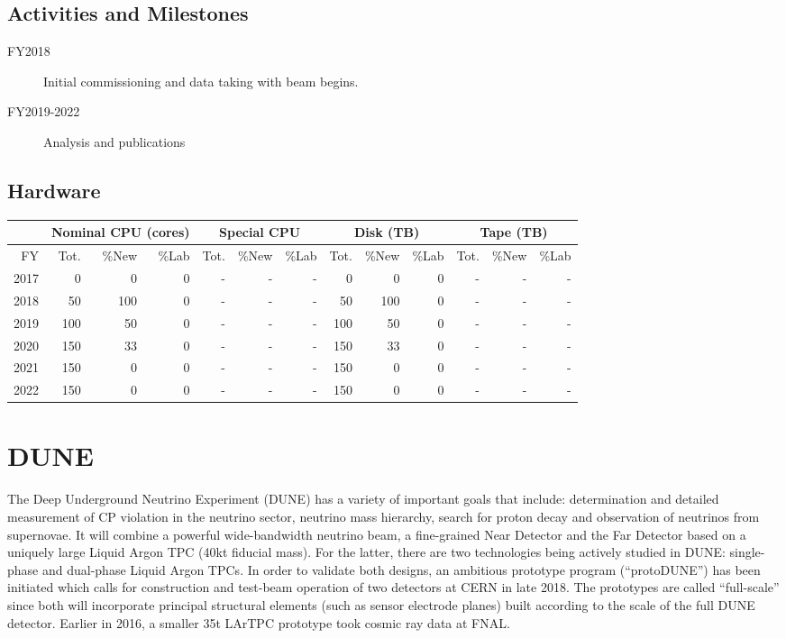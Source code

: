 \documentclass[pdftex,12pt,letter]{article}
\begin{document}
\subsection{Activities and Milestones}

\begin{description}
\item[FY2018] Initial commissioning and data taking with beam begins.
\item[FY2019-2022] Analysis and publications
\end{description}

\subsection{Hardware}

\begin{tabular}[h]{|r || r|r|r || r|r|r || r|r|r || r|r|r ||}
  \hline
   & \multicolumn{3}{c||}{Nominal CPU (cores)} & \multicolumn{3}{c||}{Special CPU} & \multicolumn{3}{c||}{Disk (TB)} & \multicolumn{3}{c||}{Tape (TB)} \\
   \hline
  FY & Tot. & \%New & \%Lab & Tot. & \%New & \%Lab & Tot. & \%New & \%Lab & Tot. & \%New & \%Lab \\
  \hline
  2017 &0 &0 &0 &   -& -& -& 0& 0& 0&- &- &- \\
  \hline
  2018 &50 & 100 &0& -& -& -&  50 & 100 & 0 &- &- &-  \\
  \hline
  2019 &100 & 50& 0& -& -& -& 100 & 50 & 0 &- &- &-  \\
  \hline
  2020 &150 & 33& 0& -& -& -& 150 & 33 & 0 &- &- &-  \\
  \hline
  2021 &150 & 0& 0& -& -& -& 150 & 0 & 0 &- &- &-  \\
  \hline
  2022 &150 & 0& 0& -& -& -& 150 & 0 & 0 &- &- &-  \\
  \hline
\end{tabular}


\pagebreak
\section{DUNE}

The Deep Underground Neutrino Experiment (DUNE) has a variety of important goals that
include:
determination and detailed measurement of CP violation in the neutrino sector,
neutrino mass hierarchy, search for proton decay and observation of neutrinos from supernovae.
It will combine a powerful wide-bandwidth neutrino beam, a fine-grained Near Detector and
the Far Detector based on a uniquely large Liquid Argon TPC (40kt fiducial mass). For the latter,
there are two technologies being actively studied in DUNE: single-phase and dual-phase Liquid Argon TPCs.
In order to validate both designs, an ambitious prototype program (``protoDUNE'') has been initiated which calls
for construction and test-beam operation of two detectors at CERN in late 2018. The  prototypes are called ``full-scale''
since both will incorporate principal structural elements (such as sensor electrode planes) built according to the scale
of the full DUNE detector. Earlier in 2016, a smaller 35t LArTPC prototype took cosmic ray data at FNAL.
\end{document}
